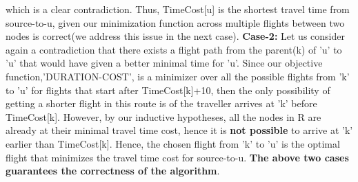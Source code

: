 \documentclass{article}
\begin{document}
  which is a clear contradiction. Thus, TimeCost[u] is the shortest travel time from source-to-u, given our minimization function across multiple flights between two nodes is correct(we address this issue in the next case).  \newline
  \textbf {Case-2:} Let us consider again a contradiction that there exists a flight path from the parent(k) of 'u' to 'u' that would have given a better minimal time for 'u'. Since our objective function,'DURATION-COST', is a minimizer over all the possible flights from 'k' to 'u' for flights that start after TimeCost[k]+10, then the only possibility of getting a shorter flight in this route is of the traveller arrives at 'k' before TimeCost[k]. However, by our inductive hypotheses, all the nodes in R are already at their minimal travel time cost, hence it is \textbf {not possible} to arrive at 'k' earlier than TimeCost[k]. Hence, the chosen flight from 'k' to 'u' is the optimal flight that minimizes the travel time cost for source-to-u. \newline
  \textbf {The above two cases guarantees the correctness of the algorithm}. \newline
\end{document}
